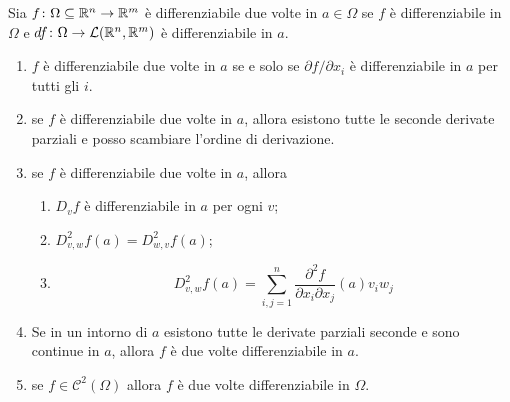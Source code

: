 \documentclass[a4paper]{article}
\begin{document}
\begin{radioactive}
\begin{snippetdefinition}{}
    Sia \(f\colon \Omega \subseteq \mathbb{R}^n \to \mathbb{R}^m\)
    è differenziabile due volte in \(a \in \Omega\) se
    \(f\) è differenziabile in \(\Omega\) e \(df \colon \Omega \to \mathcal{L}(\mathbb{R}^n, \mathbb{R}^m)\)
    è differenziabile in \(a\).
\end{snippetdefinition}

\begin{snippetproposition}{}
    \begin{enumerate}
        \item \(f\) è differenziabile due volte in \(a\)
        se e solo se \(\partial f/\partial x_i\) è differenziabile in \(a\)
        per tutti gli \(i\).
        \item se \(f\) è differenziabile due volte in \(a\),
        allora esistono tutte le seconde derivate parziali
        e posso scambiare l'ordine di derivazione.
        \item se \(f\) è differenziabile due volte in \(a\), allora
        \begin{enumerate}
            \item \(D_vf\) è differenziabile in \(a\) per ogni \(v\);
            \item \(D_{v,w}^2 f(a) = D_{w,v}^2 f(a)\);
            \item \[
                D_{v,w}^2 f(a) = \sum_{i,j=1}^n \frac{\partial^2 f}{\partial x_i \partial x_j}(a)v_iw_j
            \]
        \end{enumerate}
        \item Se in un intorno di \(a\) esistono tutte le derivate parziali seconde e sono continue in \(a\),
        allora \(f\) è due volte differenziabile in \(a\).
        \item se \(f \in \mathcal{C}^2(\Omega)\) allora \(f\) è due volte differenziabile
        in \(\Omega\).
    \end{enumerate}
\end{snippetproposition}
\end{radioactive}
\end{document}
